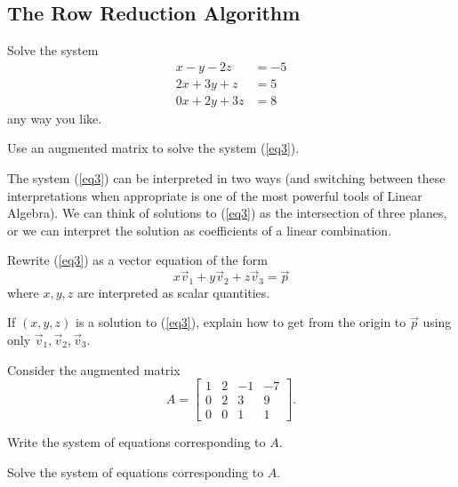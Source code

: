\documentclass[letter]{article}
\begin{document}
\subsection*{The Row Reduction Algorithm}

	\begin{Enum}
		\item Solve the system
		\begin{equation}\label{eq3}
			\begin{array}{ll}
				x-y-2z &= -5\\
				2x+3y+z &= 5\\
				0x+2y+3z &= 8
			\end{array}
		\end{equation}
		any way you like.

		\item Use an augmented matrix to solve the system (\ref{eq3}).
	\end{Enum}

	The system (\ref{eq3}) can be interpreted in two ways (and switching between these 
	interpretations when appropriate is one of the most powerful tools of Linear 
	Algebra).  We can think of solutions to (\ref{eq3})
	as the intersection of three planes, or we can interpret the solution
	as coefficients of a linear combination.

	\begin{Enum}[resume]
		\item Rewrite (\ref{eq3}) as a vector equation of the form
		\[
			x\vec v_1+y\vec v_2+z\vec v_3 = \vec p
		\]
		where $x,y,z$ are interpreted as scalar quantities.

		\item If $(x,y,z)$ is a solution to (\ref{eq3}), explain how to get from the
		origin to $\vec p$ using only $\vec v_1, \vec v_2, \vec v_3$.
	\end{Enum}

	Consider the augmented matrix
	\[
		A=\left[\begin{array}{ccc|c}
			1 & 2 & -1 & -7\\
			0 & 2 & 3 & 9\\
			0 & 0 & 1 & 1
		\end{array}\right].
	\]
	\begin{Enum}
		\item Write the system of equations corresponding to $A$.
		\item Solve the system of equations corresponding to $A$.
	\end{Enum}
\end{document}
